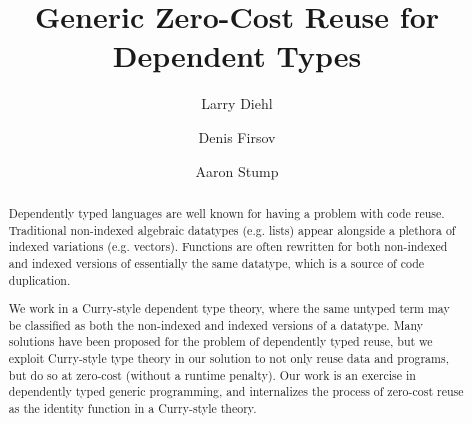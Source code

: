 \documentclass[acmsmall]{acmart}\settopmatter{}
\begin{document}
\title{Generic Zero-Cost Reuse for Dependent Types}



\author{Larry Diehl}
\author{Denis Firsov}
\author{Aaron Stump}

\begin{abstract}
Dependently typed languages are well known for having a problem with
code reuse. Traditional non-indexed algebraic datatypes (e.g. lists)
appear alongside a plethora of indexed variations (e.g. vectors).
Functions are often rewritten for both non-indexed and indexed versions of
essentially the same datatype, which is a source of code duplication.

We work in a Curry-style dependent type theory, where the same untyped
term may be classified as both the non-indexed and indexed versions of
a datatype. Many solutions have been proposed for the problem of
dependently typed reuse, but we exploit Curry-style type theory in our
solution to not only reuse data and programs, but do so at zero-cost
(without a runtime penalty). Our work is an exercise in dependently
typed generic programming, and internalizes the process
of zero-cost reuse as the identity function in a
Curry-style theory.
\end{abstract}
\end{document}
